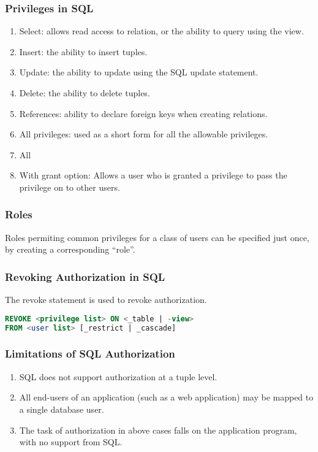 \subsubsection{Privileges in SQL}
\begin{enumerate}
    \item Select: allows read access to relation, or the ability to query using the view. 
    \item Insert: the ability to insert tuples.
    \item Update: the ability to update using the SQL update statement.
    \item Delete: the ability to delete tuples.
    \item References: ability to declare foreign keys when creating relations.
    \item All privileges: used as a short form for all the allowable privileges.
    \item All
    \item With grant option: Allows a user who is granted a privilege to pass the privilege on to other users.
\end{enumerate}

\subsubsection{Roles}
Roles permiting common privileges for a class of users can be specified just once, by creating a corresponding ``role''.

\subsubsection{Revoking Authorization in SQL}
The revoke statement is used to revoke authorization. 
\begin{lstlisting}[language=sql,morekeywords={REFERENCES, WITH}]
REVOKE <privilege list> ON <_table | -view>
FROM <user list> [_restrict | _cascade]
\end{lstlisting}

\subsubsection{Limitations of SQL Authorization}
\begin{enumerate}
    \item SQL does not support authorization at a tuple level.
    \item All end-users of an application (such as a web application) may be mapped to a single database user.
    \item The task of authorization in above cases falls on the application program, with no support from SQL.
\end{enumerate}

